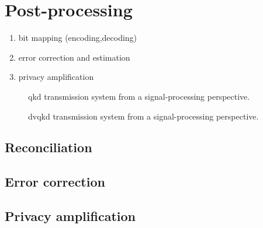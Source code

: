 \section{Post-processing}

\begin{enumerate}
	\item bit mapping (encoding,decoding)
	\item error correction and estimation
	\item privacy amplification
\end{enumerate}




\begin{figure}[htb]
	\centering
	
	\caption{\Gls{qkd} transmission system from a signal-processing perspective.}
\end{figure}

\begin{figure}[htb]
	\centering
	
	\caption{\Gls{dvqkd} transmission system from a signal-processing perspective.}
\end{figure}

\cite{Silberhorn2002} %
\cite{Fung2010} %

\subsection{Reconciliation}
\cite{Leverrier2008} %
\cite{Elkouss2011} %

\subsection{Error correction}


\subsection{Privacy amplification}


\cite{Bennett1995} %